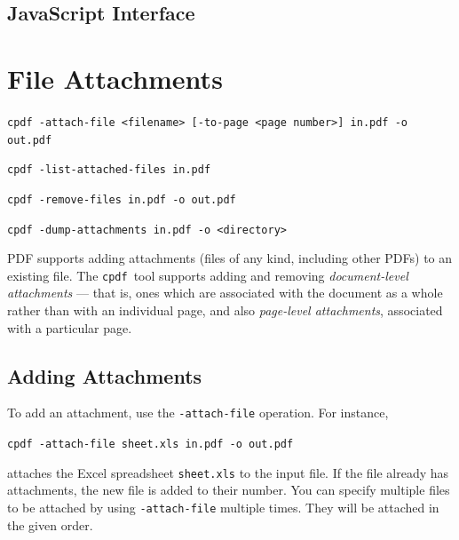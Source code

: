 \documentclass{book}
\newcommand{\cpdf}{\texttt{cpdf}}
\begin{document}
\begin{jscpdflib}
\clearpage
\section*{JavaScript Interface}
\begin{small}\tt

\end{small}
\end{jscpdflib}

\chapter{File Attachments}\label{chap:12}\pagestyle{fancy}
\begin{framed}
  \small\noindent\verb!cpdf -attach-file <filename> [-to-page <page number>] in.pdf -o out.pdf!

  \vspace{1.5mm}
  \small\noindent\verb!cpdf -list-attached-files in.pdf!
 
  \vspace{1.5mm}
  \small\noindent\verb!cpdf -remove-files in.pdf -o out.pdf!

  \vspace{1.5mm}
  \small\noindent\verb!cpdf -dump-attachments in.pdf -o <directory>!
\end{framed}
  PDF supports adding attachments (files of any kind, including other PDFs) to
an existing file. The \cpdf\ tool supports adding and removing \textit{document-level
attachments} --- that is, ones which are associated with the document as a
whole rather than with an individual page, and also \textit{page-level attachments}, associated with a particular page.
  \section{Adding Attachments}
  To add an attachment, use the \texttt{-attach-file} operation. For instance,
  \begin{framed}
  \noindent\small\verb!cpdf -attach-file sheet.xls in.pdf -o out.pdf!
  \end{framed}
  \noindent attaches the Excel spreadsheet \texttt{sheet.xls} to the input file. If the file already has attachments, the new file is added to their number. You can specify multiple files to be attached by using \verb!-attach-file! multiple times. They will be attached in the given order.
  
\end{document}
